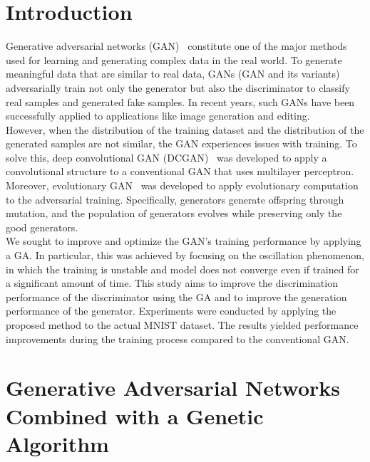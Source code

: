 \section{Introduction}
\label{sec:introduction}
Generative adversarial networks (GAN)~\cite{DBLP:conf/nips/GoodfellowPMXWOCB14} constitute one of the major methods used for learning and generating complex data in the real world. To generate meaningful data that are similar to real data, GANs (GAN and its variants) adversarially train not only the generator but also the discriminator to classify real samples and generated fake samples. In recent years, such GANs have been successfully applied to applications like image generation and editing.\\
However, when the distribution of the training dataset and the distribution of the generated samples are not similar, the GAN experiences issues with training. To solve this, deep convolutional GAN (DCGAN)~\cite{DBLP:journals/corr/RadfordMC15} was developed to apply a convolutional structure to a conventional GAN that uses multilayer perceptron. Moreover, evolutionary GAN~\cite{DBLP:journals/corr/abs-1803-00657} was developed to apply evolutionary computation to the adversarial training. Specifically, generators generate offspring through mutation, and the population of generators evolves while preserving only the good generators.\\
We sought to improve and optimize the GAN’s training performance by applying a GA. In particular, this was achieved by focusing on the oscillation phenomenon, in which the training is unstable and model does not converge even if trained for a significant amount of time. This study aims to improve the discrimination performance of the discriminator using the GA and to improve the generation performance of the generator. Experiments were conducted by applying the proposed method to the actual MNIST dataset. The results yielded performance improvements during the training process compared to the conventional GAN.


\section{Generative Adversarial Networks Combined with a Genetic Algorithm}
